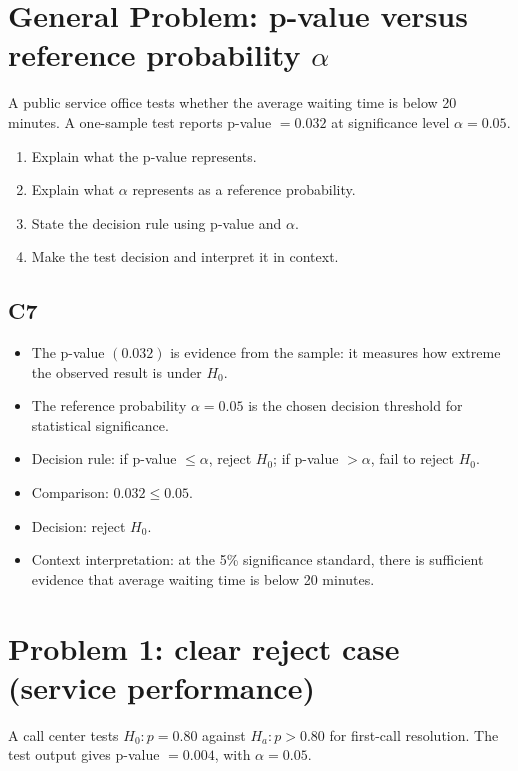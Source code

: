 \begin{ExamProblems}

\item
\section{General Problem: p-value versus reference probability \(\alpha\)}
A public service office tests whether the average waiting time is below 20 minutes.
A one-sample test reports p-value \(=0.032\) at significance level \(\alpha=0.05\).

\begin{enumerate}
    \item Explain what the p-value represents.
    \item Explain what \(\alpha\) represents as a reference probability.
    \item State the decision rule using p-value and \(\alpha\).
    \item Make the test decision and interpret it in context.
\end{enumerate}

\subsection*{C7}
\begin{itemize}
    \item The p-value \((0.032)\) is evidence from the sample: it measures how extreme the observed result is under \(H_0\).
    \item The reference probability \(\alpha=0.05\) is the chosen decision threshold for statistical significance.
    \item Decision rule: if p-value \(\le \alpha\), reject \(H_0\); if p-value \(>\alpha\), fail to reject \(H_0\).
    \item Comparison: \(0.032 \le 0.05\).
    \item Decision: reject \(H_0\).
    \item Context interpretation: at the 5\% significance standard, there is sufficient evidence that average waiting time is below 20 minutes.
\end{itemize}

\item
\section{Problem 1: clear reject case (service performance)}
A call center tests \(H_0:p=0.80\) against \(H_a:p>0.80\) for first-call resolution.
The test output gives p-value \(=0.004\), with \(\alpha=0.05\).


\end{ExamProblems}
